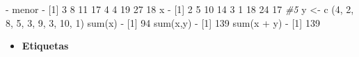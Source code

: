 \documentclass[
]{book}
\newenvironment{Shaded}{\begin{snugshade}}{\end{snugshade}}
\newcommand{\CommentTok}[1]{\textcolor[rgb]{0.56,0.35,0.01}{\textit{#1}}}
\newcommand{\DecValTok}[1]{\textcolor[rgb]{0.00,0.00,0.81}{#1}}
\newcommand{\FunctionTok}[1]{\textcolor[rgb]{0.00,0.00,0.00}{#1}}
\newcommand{\NormalTok}[1]{#1}
\newcommand{\OtherTok}[1]{\textcolor[rgb]{0.56,0.35,0.01}{#1}}
\newcommand{\SpecialCharTok}[1]{\textcolor[rgb]{0.00,0.00,0.00}{#1}}
\providecommand{\tightlist}{%
  \setlength{\itemsep}{0pt}\setlength{\parskip}{0pt}}
\begin{document}
\begin{Shaded}
\begin{Highlighting}[]
\SpecialCharTok{{-}}\NormalTok{ menor}
\SpecialCharTok{{-}}\NormalTok{ [}\DecValTok{1}\NormalTok{]  }\DecValTok{3}  \DecValTok{8} \DecValTok{11} \DecValTok{17}  \DecValTok{4}  \DecValTok{4} \DecValTok{19} \DecValTok{27} \DecValTok{18}
\NormalTok{x}
\SpecialCharTok{{-}}\NormalTok{ [}\DecValTok{1}\NormalTok{]  }\DecValTok{2}  \DecValTok{5} \DecValTok{10} \DecValTok{14}  \DecValTok{3}  \DecValTok{1} \DecValTok{18} \DecValTok{24} \DecValTok{17}
\CommentTok{\#5}
\NormalTok{y }\OtherTok{\textless{}{-}} \FunctionTok{c}\NormalTok{ (}\DecValTok{4}\NormalTok{, }\DecValTok{2}\NormalTok{, }\DecValTok{8}\NormalTok{, }\DecValTok{5}\NormalTok{, }\DecValTok{3}\NormalTok{, }\DecValTok{9}\NormalTok{, }\DecValTok{3}\NormalTok{, }\DecValTok{10}\NormalTok{, }\DecValTok{1}\NormalTok{)}
\FunctionTok{sum}\NormalTok{(x)}
\SpecialCharTok{{-}}\NormalTok{ [}\DecValTok{1}\NormalTok{] }\DecValTok{94}
\FunctionTok{sum}\NormalTok{(x,y)}
\SpecialCharTok{{-}}\NormalTok{ [}\DecValTok{1}\NormalTok{] }\DecValTok{139}
\FunctionTok{sum}\NormalTok{(x }\SpecialCharTok{+}\NormalTok{ y)}
\SpecialCharTok{{-}}\NormalTok{ [}\DecValTok{1}\NormalTok{] }\DecValTok{139}
\end{Highlighting}
\end{Shaded}

\begin{itemize}
\tightlist
\item
  \textbf{Etiquetas}
\end{itemize}
\end{document}
